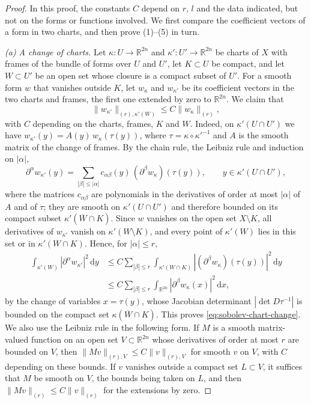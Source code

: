 \begin{proof}
In this proof, the constants $C$ depend on $r$, $l$ and the data indicated, but not on the forms or functions involved. We first compare the coefficient vectors of a form in two charts, and then prove (1)--(5) in turn.

\emph{(a) A change of charts.} Let $\kappa\colon U\to\mathbb R^{2n}$ and $\kappa'\colon U'\to\mathbb R^{2n}$ be charts of $X$ with frames of the bundle of forms over $U$ and $U'$, let $K\subset U$ be compact, and let $W\subset U'$ be an open set whose closure is a compact subset of $U'$. For a smooth form $w$ that vanishes outside $K$, let $w_\kappa$ and $w_{\kappa'}$ be its coefficient vectors in the two charts and frames, the first one extended by zero to $\mathbb R^{2n}$. We claim that
\begin{equation}\label{eq:sobolev-chart-change}
 \|w_{\kappa'}\|_{(r),\kappa'(W)}\leq C\|w_\kappa\|_{(r)},
\end{equation}
with $C$ depending on the charts, frames, $K$ and $W$. Indeed, on $\kappa'(U\cap U')$ we have $w_{\kappa'}(y)=A(y)\,w_\kappa(\tau(y))$, where $\tau=\kappa\circ\kappa'^{-1}$ and $A$ is the smooth matrix of the change of frames. By the chain rule, the Leibniz rule and induction on $|\alpha|$,
\[
 \partial^\alpha w_{\kappa'}(y)=\sum_{|\beta|\leq|\alpha|}c_{\alpha\beta}(y)\,(\partial^\beta w_\kappa)(\tau(y)),\qquad y\in\kappa'(U\cap U'),
\]
where the matrices $c_{\alpha\beta}$ are polynomials in the derivatives of order at most $|\alpha|$ of $A$ and of $\tau$; they are smooth on $\kappa'(U\cap U')$ and therefore bounded on its compact subset $\kappa'(\overline W\cap K)$. Since $w$ vanishes on the open set $X\setminus K$, all derivatives of $w_{\kappa'}$ vanish on $\kappa'(W\setminus K)$, and every point of $\kappa'(W)$ lies in this set or in $\kappa'(W\cap K)$. Hence, for $|\alpha|\leq r$,
\[
 \begin{aligned}
 \int_{\kappa'(W)}|\partial^\alpha w_{\kappa'}|^2\,\mathrm dy
 &\leq C\sum_{|\beta|\leq r}\int_{\kappa'(W\cap K)}|(\partial^\beta w_\kappa)(\tau(y))|^2\,\mathrm dy\\
 &\leq C\sum_{|\beta|\leq r}\int_{\mathbb R^{2n}}|\partial^\beta w_\kappa(x)|^2\,\mathrm dx,
 \end{aligned}
\]
by the change of variables $x=\tau(y)$, whose Jacobian determinant $|\det D\tau^{-1}|$ is bounded on the compact set $\kappa(\overline W\cap K)$. This proves \eqref{eq:sobolev-chart-change}. We also use the Leibniz rule in the following form. If $M$ is a smooth matrix-valued function on an open set $V\subset\mathbb R^{2n}$ whose derivatives of order at most $r$ are bounded on $V$, then $\|Mv\|_{(r),V}\leq C\|v\|_{(r),V}$ for smooth $v$ on $V$, with $C$ depending on these bounds. If $v$ vanishes outside a compact set $L\subset V$, it suffices that $M$ be smooth on $V$, the bounds being taken on $L$, and then $\|Mv\|_{(r)}\leq C\|v\|_{(r)}$ for the extensions by zero.


\end{proof}
